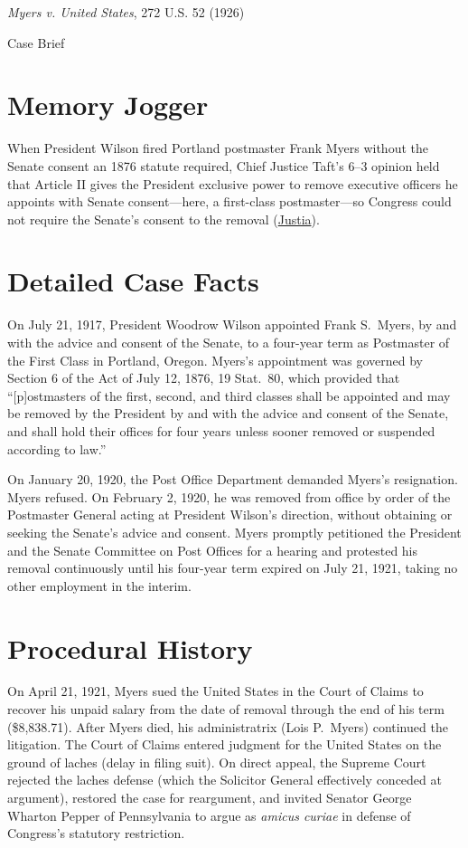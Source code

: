 \documentclass[12pt]{article}
\begin{document}
\begin{center}
{\LARGE \textit{Myers v. United States}, 272 U.S. 52 (1926)\par}
\vspace{0.8em}
{\large Case Brief\par}
\end{center}
\vspace{1em}

\section{Memory Jogger}
When President Wilson fired Portland postmaster Frank Myers without the Senate consent an 1876 statute required, Chief Justice Taft's 6--3 opinion held that Article II gives the President exclusive power to remove executive officers he appoints with Senate consent---here, a first-class postmaster---so Congress could not require the Senate's consent to the removal (\href{https://supreme.justia.com/cases/federal/us/272/52/}{Justia}).

\section{Detailed Case Facts}
On July 21, 1917, President Woodrow Wilson appointed Frank S.\ Myers, by and with the advice and consent of the Senate, to a four-year term as Postmaster of the First Class in Portland, Oregon. Myers's appointment was governed by Section 6 of the Act of July 12, 1876, 19 Stat.\ 80, which provided that ``[p]ostmasters of the first, second, and third classes shall be appointed and may be removed by the President by and with the advice and consent of the Senate, and shall hold their offices for four years unless sooner removed or suspended according to law.''

On January 20, 1920, the Post Office Department demanded Myers's resignation. Myers refused. On February 2, 1920, he was removed from office by order of the Postmaster General acting at President Wilson's direction, without obtaining or seeking the Senate's advice and consent. Myers promptly petitioned the President and the Senate Committee on Post Offices for a hearing and protested his removal continuously until his four-year term expired on July 21, 1921, taking no other employment in the interim.

\section{Procedural History}
On April 21, 1921, Myers sued the United States in the Court of Claims to recover his unpaid salary from the date of removal through the end of his term (\$8,838.71). After Myers died, his administratrix (Lois P.\ Myers) continued the litigation. The Court of Claims entered judgment for the United States on the ground of laches (delay in filing suit). On direct appeal, the Supreme Court rejected the laches defense (which the Solicitor General effectively conceded at argument), restored the case for reargument, and invited Senator George Wharton Pepper of Pennsylvania to argue as \textit{amicus curiae} in defense of Congress's statutory restriction.
\end{document}
